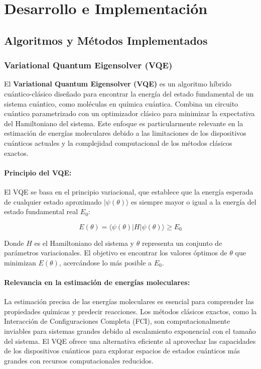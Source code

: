 \section{Desarrollo e Implementación}

\subsection{Algoritmos y Métodos Implementados}

\subsubsection{Variational Quantum Eigensolver (VQE)}

El \textbf{Variational Quantum Eigensolver (VQE)} es un algoritmo híbrido cuántico-clásico diseñado para encontrar la energía del estado fundamental de un sistema cuántico, como moléculas en química cuántica. Combina un circuito cuántico parametrizado con un optimizador clásico para minimizar la expectativa del Hamiltoniano del sistema. Este enfoque es particularmente relevante en la estimación de energías moleculares debido a las limitaciones de los dispositivos cuánticos actuales y la complejidad computacional de los métodos clásicos exactos.

\paragraph{Principio del VQE:}

El VQE se basa en el principio variacional, que establece que la energía esperada de cualquier estado aproximado \( |\psi(\theta)\rangle \) es siempre mayor o igual a la energía del estado fundamental real \( E_0 \):

\[
E(\theta) = \langle \psi(\theta) | H | \psi(\theta) \rangle \geq E_0
\]

Donde \( H \) es el Hamiltoniano del sistema y \( \theta \) representa un conjunto de parámetros variacionales. El objetivo es encontrar los valores óptimos de \( \theta \) que minimizan \( E(\theta) \), acercándose lo más posible a \( E_0 \).

\paragraph{Relevancia en la estimación de energías moleculares:}

La estimación precisa de las energías moleculares es esencial para comprender las propiedades químicas y predecir reacciones. Los métodos clásicos exactos, como la Interacción de Configuraciones Completa (FCI), son computacionalmente inviables para sistemas grandes debido al escalamiento exponencial con el tamaño del sistema. El VQE ofrece una alternativa eficiente al aprovechar las capacidades de los dispositivos cuánticos para explorar espacios de estados cuánticos más grandes con recursos computacionales reducidos.

